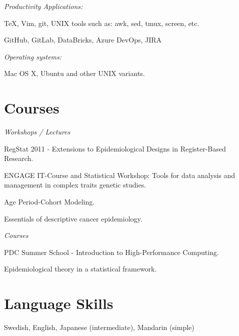 \halfblankline

\textit{Productivity Applications:}
\begin{innerlist}
\item \TeX{}, Vim, git, UNIX tools such as: awk, sed, tmux, screen, etc.
\item GitHub, GitLab, DataBricks, Azure DevOps, JIRA
\end{innerlist}

\halfblankline

\textit{Operating systems:}
\begin{innerlist}
\item Mac OS X, Ubuntu and other UNIX variants.
\end{innerlist}


%
%
\section{Courses}
\textit{Workshops / Lectures}
\begin{innerlist}
\item RegStat 2011 - Extensions to Epidemiological Designs in Register-Based Research.
\item ENGAGE IT-Course and Statistical Workshop: Tools for data analysis and management in complex traits genetic studies.
\item Age Period-Cohort Modeling.
\item Essentials of descriptive cancer epidemiology.
\end{innerlist}

\halfblankline

\textit{Courses}
\begin{innerlist}
\item PDC Summer School - Introduction to High-Performance Computing.
\item Epidemiological theory in a statistical framework.
\end{innerlist}


%
%
\section{Language Skills}
Swedish, English, Japanese (intermediate), Mandarin (simple)
